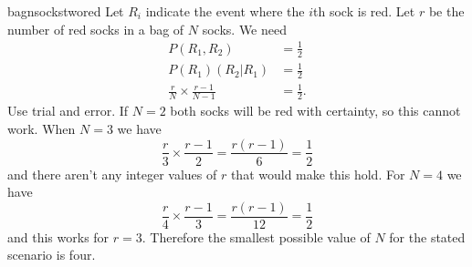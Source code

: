 \begin{answer}{bagnsockstwored}
Let $R_i$ indicate the event where the $i$th sock is red.
Let $r$ be the number of red socks in a bag of $N$ socks.
We need
\begin{align*}
  P(R_1,R_2)     &= \frac{1}{2} \\
  P(R_1)(R_2|R_1) &= \frac{1}{2} \\
  \frac{r}{N} \times
  \frac{r-1}{N-1}
   &=
  \frac{1}{2}
  \text{.}
\end{align*}
Use trial and error.
If $N=2$ both socks will be red with certainty, so this cannot work.
When $N=3$ we have
\[
  \frac{r}{3} \times
  \frac{r-1}{2}
   =
  \frac{r(r-1)}{6}
   =
  \frac{1}{2}
\]
and there aren't any integer values of $r$ that would make this hold.
For $N=4$ we have
\[
  \frac{r}{4} \times
  \frac{r-1}{3}
   =
  \frac{r(r-1)}{12}
   =
  \frac{1}{2}
\]
and this works for $r=3$.
Therefore the smallest possible value of $N$ for the stated scenario is four.

\end{answer}

